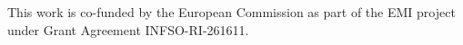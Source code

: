 This work is co-funded by the European Commission as part of the EMI project under Grant Agreement INFSO-RI-261611.
